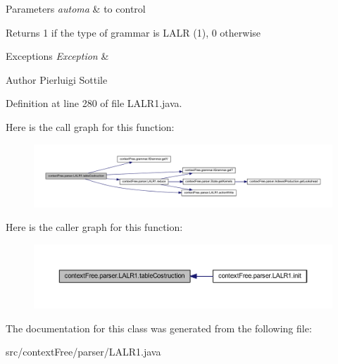 \begin{DoxyParams}{Parameters}
{\em automa} & to control \\
\hline
\end{DoxyParams}
\begin{DoxyReturn}{Returns}
1 if the type of grammar is L\-A\-L\-R (1), 0 otherwise 
\end{DoxyReturn}

\begin{DoxyExceptions}{Exceptions}
{\em Exception} & \\
\hline
\end{DoxyExceptions}
\begin{DoxyAuthor}{Author}
Pierluigi Sottile 
\end{DoxyAuthor}


Definition at line 280 of file L\-A\-L\-R1.\-java.



Here is the call graph for this function\-:\nopagebreak
\begin{figure}[H]
\begin{center}
\leavevmode
\includegraphics[width=350pt]{classcontext_free_1_1parser_1_1_l_a_l_r1_a79576626b3b59b832faecc986b293b36_cgraph}
\end{center}
\end{figure}




Here is the caller graph for this function\-:\nopagebreak
\begin{figure}[H]
\begin{center}
\leavevmode
\includegraphics[width=350pt]{classcontext_free_1_1parser_1_1_l_a_l_r1_a79576626b3b59b832faecc986b293b36_icgraph}
\end{center}
\end{figure}




The documentation for this class was generated from the following file\-:\begin{DoxyCompactItemize}
\item 
src/context\-Free/parser/L\-A\-L\-R1.\-java\end{DoxyCompactItemize}
